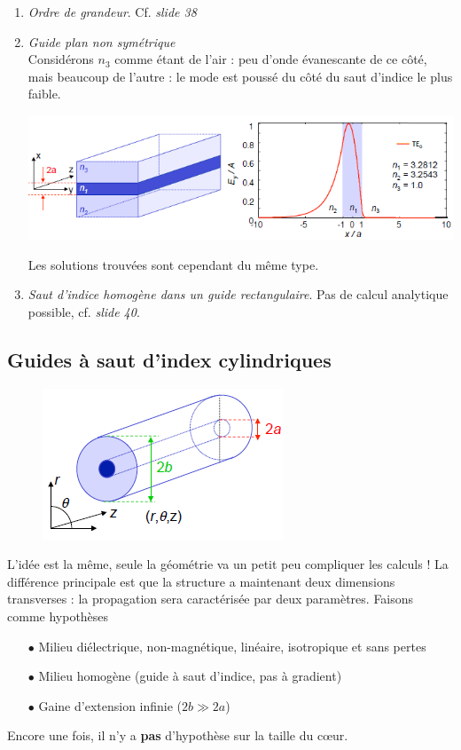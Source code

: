 \begin{enumerate}
\item \textit{Ordre de grandeur}. Cf. \textit{slide 38}
\item \textit{Guide plan non symétrique}\\
Considérons $n_3$ comme étant de l'air : peu d'onde évanescante de ce côté, mais beaucoup de l'autre :
le mode est poussé du côté du saut d'indice le plus faible.
\begin{center}
	\includegraphics[scale=0.75]{ch1/image19.png}
\end{center}
 Les solutions trouvées sont cependant
du même type.
\item \textit{Saut d'indice homogène dans un guide rectangulaire}. Pas de calcul analytique possible,
cf. \textit{slide 40}.
\end{enumerate}

\subsection{Guides à saut d'index cylindriques}
	\begin{figure}
	\vspace{-5mm}
	\includegraphics[scale=0.75]{ch1/image20.png}
	\end{figure}
L'idée est la même, seule la géométrie va un petit peu compliquer les calculs ! La différence 
principale est que la structure a maintenant deux dimensions transverses : la propagation sera
caractérisée par deux paramètres. Faisons comme 
hypothèses
\begin{itemize}
\item[$\bullet$] Milieu diélectrique, non-magnétique, linéaire, isotropique et sans pertes
\item[$\bullet$] Milieu homogène (guide à saut d'indice, pas à gradient)
\item[$\bullet$] Gaine d'extension infinie ($2b\gg 2a$)
\end{itemize}
Encore une fois, il n'y a \textbf{pas} d'hypothèse sur la taille du cœur. \\

